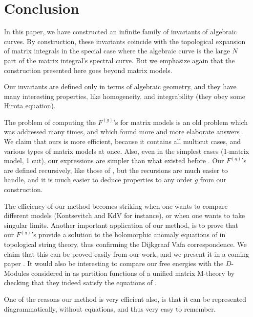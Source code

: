 


\section{Conclusion}

In this paper, we have constructed an infinite family of invariants of algebraic curves.
By construction, these invariants coincide with the topological expansion of matrix integrals in the special case where the algebraic curve is the large $N$ part of the matrix integral's spectral curve.
But we emphasize again that the construction presented here goes beyond matrix models.

Our invariants are defined only in terms of algebraic geometry, and they have many interesting properties, like homogeneity, and integrability (they obey some Hirota equation).

The problem of computing the $F^{(g)}$'s for matrix models is an old problem which was addressed many times, and which found more and more elaborate answers \cite{ACKM}.
We claim that ours is more efficient, because it contains all multicut cases, and various types of matrix models at once. Also, even in the simplest cases (1-matrix model, 1 cut), our expressions are simpler than what existed before \cite{ACKM}.
Our $F^{(g)}$'s are defined recursively, like those of \cite{ACKM}, but the recursions are much easier to handle, and it is much easier to deduce properties to any order $g$ from our construction.

The efficiency of our method becomes striking when one wants to compare different models (Kontsevitch and KdV for instance), or when one wants to take singular limits.
Another important application of our method, is to prove that our $F^{(g)}$'s provide a solution to the holomorphic anomaly equations of \cite{BCOV} in topological string theory, thus confirming the Dijkgraaf Vafa correspondence. We claim that this can be proved easily from our work, and we present it in a coming paper \cite{EMO}.
It would also be interesting to compare our free energies with the $D$-Modules considered in \cite{Mth1,Mth2} as partition functions of a unified matrix M-theory by checking
that they indeed satisfy the equations of \cite{Mth2}.

One of the reasons our method is very efficient also, is that it can be represented diagrammatically, without equations, and thus very easy to remember.



